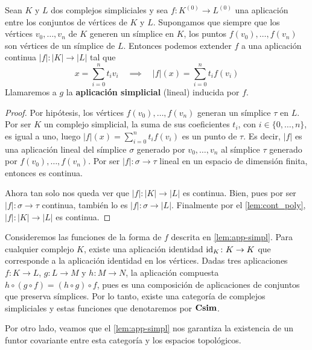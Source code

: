 \begin{lema}
	\label{lem:app-simpl} Sean $K$ y $L$ dos complejos simpliciales y sea $f: K^{(0)}
	\rightarrow L^{(0)}$ una aplicación entre los conjuntos de vértices de $K$ y $L$.
	Supongamos que siempre que los vértices $v_{0}, \ldots, v_{n}$ de $K$ generen
	un símplice en $K$, los puntos $f(v_{0}), \ldots, f(v_{n})$ son vértices de un
	símplice de $L$. Entonces podemos extender $f$ a una aplicación continua
	$|f| :|K| \rightarrow |L|$ tal que
	\[
	x = \sum_{i=0}^{n}t_{i}v_{i}\quad \implies \quad |f|(x) = \sum_{i=0}^{n}t_{i}
	f (v_{i})
	\]
	Llamaremos a $g$ la \textbf{aplicación simplicial} (lineal) inducida por $f$.
\end{lema}
\begin{proof}
	Por hipótesis, los vértices $f(v_{0}), \ldots, f(v_{n})$ generan un símplice
	$\tau$ en $L$. Por ser $K$ un complejo simplicial, la suma de sus coeficientes
	$t_{i}$, con $i \in \{0, \ldots, n\}$, es igual a uno, luego $|f|(x) = \sum_{i=0}
	^{n}t_{i}f(v_{i})$ es un punto de $\tau$. Es decir, $|f|$ es una aplicación lineal
	del símplice $\sigma$ generado por $v_{0}, \ldots, v_{n}$ al símplice $\tau$ generado
	por $f(v_{0}), \ldots, f(v_{n})$. Por ser $|f| : \sigma \rightarrow \tau$
	lineal en un espacio de dimensión finita, entonces es continua.
	
	Ahora tan solo nos queda ver que $|f| :|K| \rightarrow |L|$ es continua. Bien,
	pues por ser $|f| : \sigma \rightarrow \tau$ continua, también lo es
	$|f| : \sigma \rightarrow |L|$. Finalmente por el \autoref{lem:cont_poly},
	$|f| :|K| \rightarrow |L|$ es continua.
\end{proof}

Consideremos las funciones de la forma de $f$ descrita en \ref{lem:app-simpl}. Para
cualquier complejo $K$, existe una aplicación identidad $\operatorname{id}_{K} \colon K \to K$
que corresponde a la aplicación identidad en los vértices. Dadas tres aplicaciones
$f \colon K \to L$, $g \colon L \to M$ y $h : M \to N$, la aplicación compuesta $h
\circ (g \circ f) = (h \circ g) \circ f$, pues es una composición de
aplicaciones de conjuntos que preserva símplices. Por lo tanto, existe una
categoría de complejos simpliciales y estas funciones que denotaremos por
$\mathbf{Csim}$.

Por otro lado, veamos que el \autoref{lem:app-simpl} nos garantiza la existencia
de un funtor covariante entre esta categoría y los espacios topológicos.


